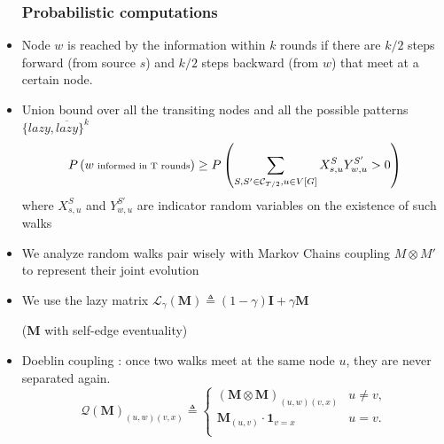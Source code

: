 \documentclass{beamer}
\renewcommand{\l}{\left}
\renewcommand{\r}{\right}
\begin{document}
\begin{frame}
\begin{itemize}
\frametitle{Probabilistic computations}
\item Node $w$ is reached by the information within $k$ rounds if there are $k/2$ steps forward (from source $s$) and $k/2$ steps backward (from $w$) that meet at a certain node.
\item  Union bound over all the transiting nodes and all the possible patterns $\{ lazy,\overline{lazy} \}^k$
\begin{align*}
  \scriptsize
  P\l(w \text{ informed in T rounds}\r) \geq P\l(\sum_{S,S'\in \mathcal C_{T/2}, u\in V[G]} X_{s,u}^S Y_{w,u}^{S'} > 0\r)
\end{align*}
 where $X_{s,u}^S$ and $Y_{w,u}^{S'}$ are indicator random variables on the existence of such walks

\end{itemize}


\end{frame}

\begin{frame}
\begin{itemize}
\frametitle{Notations}
\item We analyze random walks pair wisely with Markov Chains coupling $M \otimes M'$ to represent their joint evolution
\item We use the lazy matrix $
  \mathcal L _ \gamma (\mathbf{M}) \triangleq (1-\gamma) \mathbf{I} + \gamma \mathbf{M}
$

  (\textbf{M} with self-edge eventuality)
\item Doeblin coupling  : once two walks meet at the same node $u$, they are never separated again.
\[
  \mathcal Q(\mathbf{M})_{(u,w)(v,x)} \triangleq \left\{
    \begin{array}{ll}
      (\mathbf{M} \otimes \mathbf{M})_{(u,w)(v,x)} & u \not = v,\\
      \mathbf{M}_{(u,v)} \cdot \mathbf{1}_{v = x} & u = v.\\
    \end{array}
  \right.
\]


\end{itemize}
\end{frame}
\end{document}
